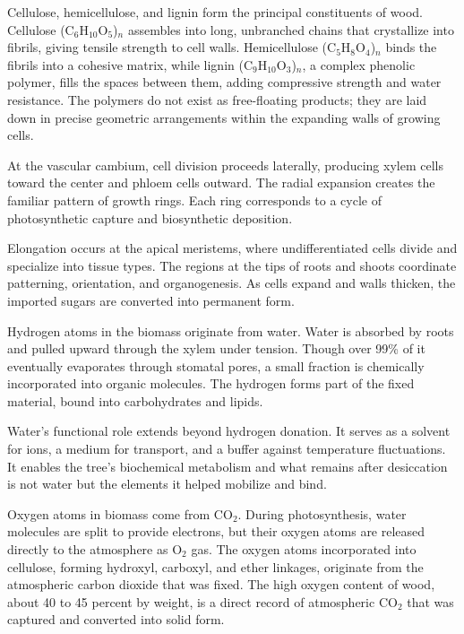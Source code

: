 Cellulose, hemicellulose, and lignin form the principal constituents of wood. Cellulose (C\(_6\)H\(_{10}\)O\(_5\))\(_n\) assembles into long, unbranched chains that crystallize into fibrils, giving tensile strength to cell walls. Hemicellulose (C\(_5\)H\(_{8}\)O\(_4\))\(_n\) binds the fibrils into a cohesive matrix, while lignin (C\(_9\)H\(_{10}\)O\(_3\))\(_n\), a complex phenolic polymer, fills the spaces between them, adding compressive strength and water resistance. The polymers do not exist as free-floating products; they are laid down in precise geometric arrangements within the expanding walls of growing cells.

At the vascular cambium, cell division proceeds laterally, producing xylem cells toward the center and phloem cells outward. The radial expansion creates the familiar pattern of growth rings. Each ring corresponds to a cycle of photosynthetic capture and biosynthetic deposition.

Elongation occurs at the apical meristems, where undifferentiated cells divide and specialize into tissue types. The regions at the tips of roots and shoots coordinate patterning, orientation, and organogenesis. As cells expand and walls thicken, the imported sugars are converted into permanent form.

Hydrogen atoms in the biomass originate from water. Water is absorbed by roots and pulled upward through the xylem under tension. Though over 99\% of it eventually evaporates through stomatal pores, a small fraction is chemically incorporated into organic molecules. The hydrogen forms part of the fixed material, bound into carbohydrates and lipids.

Water's functional role extends beyond hydrogen donation. It serves as a solvent for ions, a medium for transport, and a buffer against temperature fluctuations. It enables the tree's biochemical metabolism and what remains after desiccation is not water but the elements it helped mobilize and bind.

Oxygen atoms in biomass come from \(\mathrm{CO}_2\). During photosynthesis, water molecules are split to provide electrons, but their oxygen atoms are released directly to the atmosphere as \(\mathrm{O}_2\) gas. The oxygen atoms incorporated into cellulose, forming hydroxyl, carboxyl, and ether linkages, originate from the atmospheric carbon dioxide that was fixed. The high oxygen content of wood, about 40 to 45 percent by weight, is a direct record of atmospheric \(\mathrm{CO}_2\) that was captured and converted into solid form.

